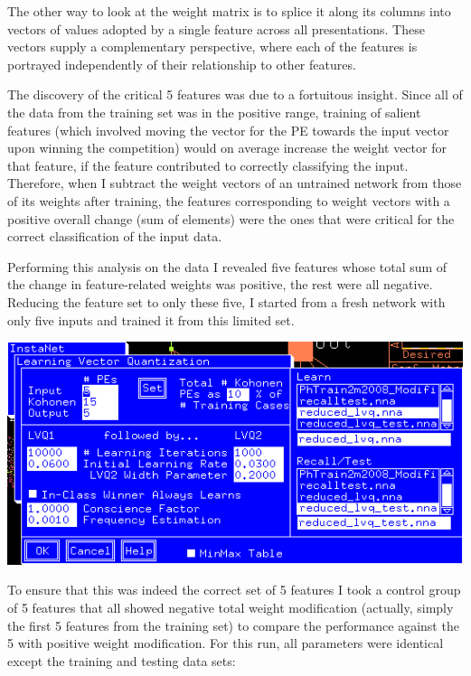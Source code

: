 \documentclass[12pt]{article}
\begin{document}
The other way to look at the weight matrix is to splice it along its columns into vectors of values adopted by a single feature across all presentations.  These vectors supply a complementary perspective, where each of the features is portrayed independently of their relationship to other features.  

The discovery of the critical 5 features was due to a fortuitous insight.  Since all of the data from the training set was in the positive range, training of salient features (which involved moving the vector for the PE towards the input vector upon winning the competition) would on average increase the weight vector for that feature, if the feature contributed to correctly classifying the input.  Therefore, when I subtract the weight vectors of an untrained network from those of its weights after training, the features corresponding to weight vectors with a positive overall change (sum of elements) were the ones that were critical for the correct classification of the input data.    

Performing this analysis on the data I revealed five features whose total sum of the change in feature-related weights was positive, the rest were all negative.  Reducing the feature set to only these five, I started from a fresh network with only five inputs and trained it from this limited set.  

\begin{center}
\includegraphics[scale=0.7]{parameters5features.png}
\end{center}

To ensure that this was indeed the correct set of 5 features I took a control group of 5 features that all showed negative total weight modification (actually, simply the first 5 features from the training set) to compare the performance against the 5 with positive weight modification.  For this run, all parameters were identical except the training and testing data sets:
\end{document}
